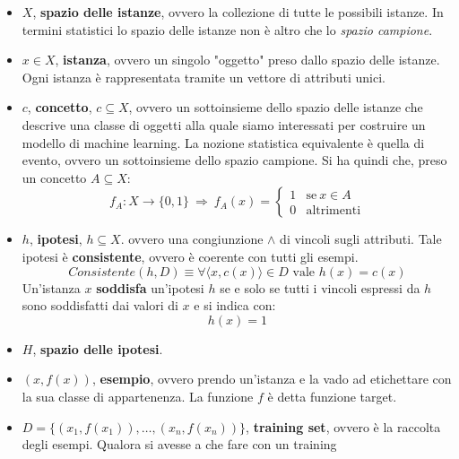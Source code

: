 \begin{itemize}
    \item $X$, \textbf{spazio delle istanze}, ovvero la collezione di tutte le
          possibili istanze. In termini statistici lo spazio delle istanze non è altro
          che lo \textit{spazio campione}.
    \item $x \in X$, \textbf{istanza}, ovvero un singolo "oggetto" preso dallo
          spazio delle istanze. Ogni istanza è rappresentata tramite un vettore di attributi unici.
    \item $c$, \textbf{concetto}, $c \subseteq X$, ovvero un sottoinsieme dello
          spazio delle istanze che descrive una classe di oggetti alla quale siamo interessati
          per costruire un modello di machine learning. La nozione statistica equivalente
          è quella di evento, ovvero un sottoinsieme dello spazio campione. Si ha quindi
          che, preso un concetto $A \subseteq X$:
          \begin{equation}
              f_A: X \to \{0, 1\} \ \Longrightarrow \ f_A(x) = \begin{cases} 1 & \text{se} \ x \in A \\ 0 & \text{altrimenti}\end{cases}
          \end{equation}
    \item $h$, \textbf{ipotesi}, $h \subseteq X$. ovvero una congiunzione $\land$
          di vincoli sugli attributi. Tale ipotesi è \textbf{consistente}, ovvero è
          coerente con tutti gli esempi.
          \begin{equation}
              Consistente(h, D) \equiv \forall \langle x, c(x) \rangle \in D \text{ vale } h(x) = c(x)
          \end{equation}
          Un'istanza $x$ \textbf{soddisfa} un'ipotesi $h$ se e solo se tutti i
          vincoli espressi da $h$ sono soddisfatti dai valori di $x$ e si indica con:
          \begin{equation}
              h(x) = 1
          \end{equation}
    \item $H$, \textbf{spazio delle ipotesi}.
    \item $(x, f(x))$, \textbf{esempio}, ovvero prendo un'istanza e la vado ad
          etichettare con la sua classe di appartenenza. La funzione $f$ è detta funzione
          target.
    \item $D = \{(x_1, f(x_1)), \dots, (x_n, f(x_n))\}$, \textbf{training set},
          ovvero è la raccolta degli esempi. Qualora si avesse a che fare con un training

\end{itemize}
